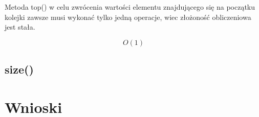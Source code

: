 \documentclass[12pt]{article}
\begin{document}
\begin{figure}[H]
    \centering
    
\end{figure}

Metoda top() w celu zwrócenia wartości elementu znajdującego się na początku kolejki zawsze musi wykonać tylko jedną operacje,
wiec złożoność obliczeniowa jest stała. 

{\Large \begin{equation*}
    O(1)
\end{equation*} }

\subsection{size()}
\begin{figure}[H]
    \centering
    
\end{figure}



\section{Wnioski}
\end{document}
